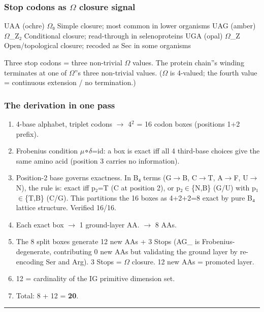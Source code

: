 \documentclass[12pt,a4paper]{article}
\begin{document}
\subsubsection{Stop codons as $\Omega$ closure signal}

\textbar{} UAA (ochre) \textbar{} $\Omega$₀ \textbar{} Simple closure; most common in lower organisms \textbar{}
\textbar{} UAG (amber) \textbar{} $\Omega$\_Z₂ \textbar{} Conditional closure; read-through in selenoproteins \textbar{}
\textbar{} UGA (opal) \textbar{} $\Omega$\_Z \textbar{} Open/topological closure; recoded as Sec in some organisms \textbar{}

Three stop codons = three non-trivial $\Omega$ values. The protein chain''s winding terminates at one of $\Omega$''s three non-trivial values. ($\Omega$ is 4-valued; the fourth value = continuous extension / no termination.)

\subsubsection{The derivation in one pass}

\begin{enumerate}
    \item 4-base alphabet, triplet codons $\rightarrow$ 4$^{2}$ = 16 codon boxes (positions 1+2 prefix).
    \item Frobenius condition $\mu$∘$\delta$=id: a box is exact iff all 4 third-base choices give the same amino acid (position 3 carries no information).
    \item Position-2 base governs exactness. In B₄ terms (G$\rightarrow$B, C$\rightarrow$T, A$\rightarrow$F, U$\rightarrow$N), the rule is: exact iff p₂=T (C at position 2), or p₂$\in$\{N,B\} (G/U) with p₁$\in$\{T,B\} (C/G). This partitions the 16 boxes as 4+2+2=8 exact by pure B₄ lattice structure. Verified 16/16.
    \item Each exact box $\rightarrow$ 1 ground-layer AA. $\rightarrow$ 8 AAs.
    \item The 8 split boxes generate 12 new AAs + 3 Stops (AG\_ is Frobenius-degenerate, contributing 0 new AAs but validating the ground layer by re-encoding Ser and Arg). 3 Stops = $\Omega$ closure. 12 new AAs = promoted layer.
    \item 12 = cardinality of the IG primitive dimension set.
    \item Total: 8 + 12 = \textbf{20}.
\end{enumerate}

\begin{center}
\rule{0.5\textwidth}{0.4pt}
\end{center}
\end{document}
